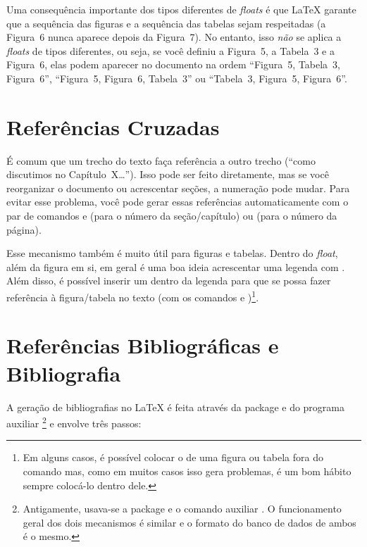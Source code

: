 Uma consequência importante dos tipos diferentes de \emph{floats} é que
\LaTeX{} garante que a sequência das figuras e a
sequência das tabelas sejam respeitadas (a Figura~6 nunca aparece depois da
Figura~7). No entanto, isso \emph{não} se aplica a \emph{floats} de tipos
diferentes, ou seja, se você definiu a Figura~5, a Tabela~3 e a Figura~6,
elas podem aparecer no documento na ordem ``Figura~5, Tabela~3, Figura~6'',
``Figura~5, Figura~6, Tabela~3'' ou ``Tabela~3, Figura~5, Figura~6''.

\section{Referências Cruzadas}
\label{sec:refs}

É comum que um trecho do texto faça referência a outro trecho (``como
discutimos no Capítulo~X\ldots''). Isso pode ser feito diretamente, mas
se você reorganizar o documento ou acrescentar seções, a numeração pode
mudar. Para evitar esse problema, você pode gerar essas referências
automaticamente com o par de comandos  e
 (para o número da seção/capítulo) ou
 (para o número da página).

Esse mecanismo também é muito útil para figuras e tabelas. Dentro do
\emph{float}, além da figura em si, em geral é uma boa ideia acrescentar
uma legenda com . Além disso, é possível
inserir um  dentro da legenda para que se possa fazer
referência à figura/tabela no texto (com os comandos  e
)\footnote{Em alguns casos, é possível colocar o
 de uma figura ou tabela fora do comando 
mas, como em muitos casos isso gera problemas, é um bom hábito sempre
colocá-lo dentro dele.}.


\section{Referências Bibliográficas e Bibliografia}

\enlargethispage{-.5\baselineskip}

A geração de bibliografias no \LaTeX{} é feita através da package
 e do programa auxiliar
\footnote{Antigamente, usava-se a package
 e o comando auxiliar .
O funcionamento geral dos dois mecanismos é similar e o formato do banco
de dados de ambos é o mesmo.} e envolve três passos:

